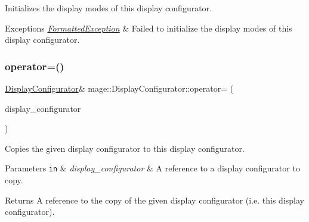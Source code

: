 Initializes the display modes of this display configurator.


\begin{DoxyExceptions}{Exceptions}
{\em \hyperlink{structmage_1_1_formatted_exception}{Formatted\+Exception}} & Failed to initialize the display modes of this display configurator. \\
\hline
\end{DoxyExceptions}
\hypertarget{classmage_1_1_display_configurator_adf24194f83a0971a1c3076c1a23d1699}{}\label{classmage_1_1_display_configurator_adf24194f83a0971a1c3076c1a23d1699} 
\subsubsection{\texorpdfstring{operator=()}{operator=()}\hspace{0.1cm}{\footnotesize\ttfamily [1/2]}}
{\footnotesize\ttfamily \hyperlink{classmage_1_1_display_configurator}{Display\+Configurator}\& mage\+::\+Display\+Configurator\+::operator= (\begin{DoxyParamCaption}\item[{const \hyperlink{classmage_1_1_display_configurator}{Display\+Configurator} \&}]{display\+\_\+configurator }\end{DoxyParamCaption})\hspace{0.3cm}{\ttfamily [delete]}}

Copies the given display configurator to this display configurator.


\begin{DoxyParams}[1]{Parameters}
\mbox{\tt in}  & {\em display\+\_\+configurator} & A reference to a display configurator to copy. \\
\hline
\end{DoxyParams}
\begin{DoxyReturn}{Returns}
A reference to the copy of the given display configurator (i.\+e. this display configurator). 
\end{DoxyReturn}
\hypertarget{classmage_1_1_display_configurator_a9d98a955cdbaf3bfe8913a4b561ad08d}{}\label{classmage_1_1_display_configurator_a9d98a955cdbaf3bfe8913a4b561ad08d} 
